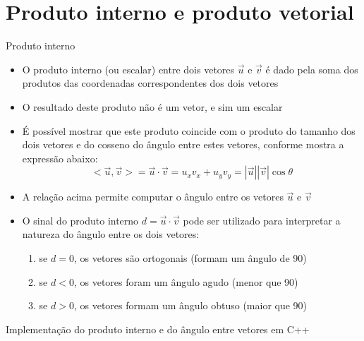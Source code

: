 \section{Produto interno e produto vetorial}

\begin{frame}[fragile]{Produto interno}

    \begin{itemize}
        \item O produto interno (ou escalar) entre dois vetores $\vec{u}$ e $\vec{v}$ é dado pela 
        soma dos produtos das coordenadas correspondentes dos dois vetores

        \item O resultado deste produto não é um vetor, e sim um escalar

        \item É possível mostrar que este produto coincide com o produto do tamanho dos dois 
            vetores e do cosseno do ângulo entre estes vetores, conforme mostra a expressão abaixo:
        \[
            <\vec{u}, \vec{v}> = \vec{u} \cdot \vec{v} = u_xv_x + u_yv_y = |\vec{u}||\vec{v}|\cos \theta
        \]

        \item A relação acima permite computar o ângulo entre os vetores $\vec{u}$ e $\vec{v}$

        \item O sinal do produto interno $d = \vec{u}\cdot\vec{v}$ pode ser utilizado para interpretar a natureza do ângulo entre os dois vetores:

        \begin{enumerate}
            \item se $d = 0$, os vetores são ortogonais (formam um ângulo de 90\textdegree)
            \item se $d < 0$, os vetores foram um ângulo agudo (menor que 90\textdegree)
            \item se $d > 0$, os vetores formam um ângulo obtuso (maior que 90\textdegree)
        \end{enumerate}
    \end{itemize}

\end{frame}

\begin{frame}[fragile]{Implementação do produto interno e do ângulo entre vetores em C++}


\end{frame}

